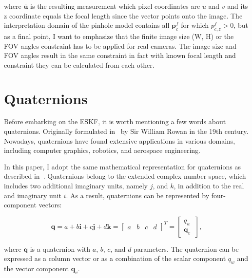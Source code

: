 where $\overline{\mathbf{u}}$ is the resulting measurement which pixel coordinates are $u$ and $v$ and its z coordinate equals the focal length since the vector points onto the image. The interpretation domain of the pinhole model contains all $\mathbf{p}_c^f$ for which $p_{c,z}^f>0$, but as a final point, I want to emphasize that the finite image size (W, H) or the FOV angles constraint has to be applied for real cameras. The image size and FOV angles result in the same constraint in fact with known focal length and constraint they can be calculated from each other.

\section{Quaternions}

Before embarking on the ESKF, it is worth mentioning a few words about quaternions. Originally formulated in~\cite{quaternions} by Sir William Rowan in the 19th century. Nowadays, quaternions have found extensive applications in various domains, including computer graphics, robotics, and aerospace engineering.

In this paper, I adopt the same mathematical representation for quaternions as described in~\cite{quaternion-eskf}. Quaternions belong to the extended complex number space, which includes two additional imaginary units, namely $j$, and $k$, in addition to the real and imaginary unit $i$. As a result, quaternions can be represented by four-component vectors:

\begin{equation}
    \mathbf{q} = a + b\mathbf{i} + c\mathbf{j} + d\mathbf{k} = \begin{bmatrix}
    a & b & c & d
    \end{bmatrix}^T = \begin{bmatrix}
    q_w \ \\ \mathbf{q}_v
    \end{bmatrix},
\end{equation}

where $\mathbf{q}$ is a quaternion with $a$, $b$, $c$, and $d$ parameters. The quaternion can be expressed as a column vector or as a combination of the scalar component $q_w$ and the vector component $\mathbf{q}_{v}$. 

